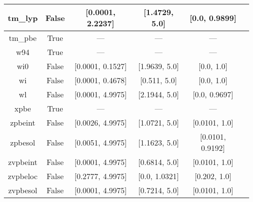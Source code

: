 \begin{tabular}{|c|c|c|c|c|l|}
       tm\_lyp &                 False & [0.0001, 2.2237] &    [1.4729, 5.0] &    [0.0, 0.9899] &                                      \cite{Thakkar2009_134109} \\ \hline
       tm\_pbe &                  True &              --- &              --- &              --- &                                      \cite{Thakkar2009_134109} \\ \hline
           w94 &                  True &              --- &              --- &              --- &                                          \cite{Wilson1994_337} \\ \hline
           wi0 &                 False & [0.0001, 0.1527] &    [1.9639, 5.0] &       [0.0, 1.0] &                                          \cite{Wilson1998_523} \\ \hline
            wi &                 False & [0.0001, 0.4678] &     [0.511, 5.0] &       [0.0, 1.0] &                                          \cite{Wilson1998_523} \\ \hline
            wl &                 False & [0.0001, 4.9975] &    [2.1944, 5.0] &    [0.0, 0.9697] &                                        \cite{Wilson1990_12930} \\ \hline
          xpbe &                  True &              --- &              --- &              --- &                                             \cite{Xu2004_4068} \\ \hline
       zpbeint &                 False & [0.0026, 4.9975] &    [1.0721, 5.0] &    [0.0101, 1.0] &                                   \cite{Constantin2011_233103} \\ \hline
       zpbesol &                 False & [0.0051, 4.9975] &    [1.1623, 5.0] & [0.0101, 0.9192] &                                   \cite{Constantin2011_233103} \\ \hline
      zvpbeint &                 False & [0.0001, 4.9975] &    [0.6814, 5.0] &    [0.0101, 1.0] &                                   \cite{Constantin2012_194105} \\ \hline
      zvpbeloc &                 False & [0.2777, 4.9975] &    [0.0, 1.0321] &     [0.202, 1.0] &                                         \cite{Fabiano2015_122} \\ \hline
      zvpbesol &                 False & [0.0001, 4.9975] &    [0.7214, 5.0] &    [0.0101, 1.0] &                                   \cite{Constantin2012_194105} \\ \hline
\end{tabular}